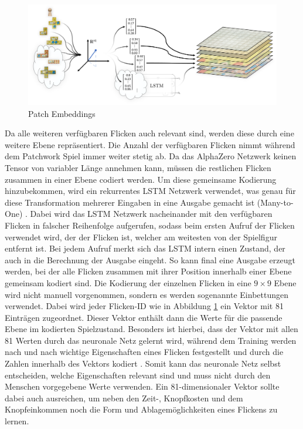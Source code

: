 \vspace*{-5cm}
\pagebreak

\begin{figure}[!ht]
    \centering
    \includegraphics[width=\textwidth]{res/pictures/patch-embeddings.png}
    \vspace*{-0.5cm}
    \caption{Patch Embeddings}
    \label{fig:patch-embeddings}
\end{figure}
\vspace*{-0.25cm}

Da alle weiteren verfügbaren Flicken auch relevant sind, werden diese durch eine weitere Ebene repräsentiert. Die Anzahl der verfügbaren Flicken nimmt während dem Patchwork Spiel immer weiter stetig ab. Da das AlphaZero Netzwerk keinen Tensor von variabler Länge annehmen kann, müssen die restlichen Flicken zusammen in einer Ebene codiert werden. Um diese gemeinsame Kodierung hinzubekommen, wird ein rekurrentes \ac{LSTM} Netzwerk verwendet, was genau für diese Transformation mehrerer Eingaben in eine Ausgabe gemacht ist (Many-to-One) \cite{2015.RNN}. Dabei wird das \ac{LSTM} Netzwerk nacheinander mit den verfügbaren Flicken in falscher Reihenfolge aufgerufen, sodass beim ersten Aufruf der Flicken verwendet wird, der der Flicken ist, welcher am weitesten von der Spielfigur entfernt ist. Bei jedem Aufruf merkt sich das \ac{LSTM} intern einen Zustand, der auch in die Berechnung der Ausgabe eingeht. So kann final eine Ausgabe erzeugt werden, bei der alle Flicken zusammen mit ihrer Position innerhalb einer Ebene gemeinsam kodiert sind. Die Kodierung der einzelnen Flicken in eine $9\times 9$ Ebene wird nicht manuell vorgenommen, sondern es werden sogenannte Einbettungen verwendet. Dabei wird jeder Flicken-\ac{ID} wie in Abbildung \ref{fig:patch-embeddings} ein Vektor mit 81 Einträgen zugeordnet. Dieser Vektor enthält dann die Werte für die passende Ebene im kodierten Spielzustand. Besonders ist hierbei, dass der Vektor mit allen 81 Werten durch das neuronale Netz gelernt wird, \dash während dem Training werden nach und nach wichtige Eigenschaften eines Flicken festgestellt und durch die Zahlen innerhalb des Vektors kodiert \cite{2023.PytorchEmbedding}. Somit kann das neuronale Netz selbst entscheiden, welche Eigenschaften relevant sind und muss nicht durch den Menschen vorgegebene Werte verwenden. Ein 81-dimensionaler Vektor sollte dabei auch ausreichen, um neben den Zeit-, Knopfkosten und dem Knopfeinkommen noch die Form und Ablagemöglichkeiten eines Flickens zu lernen.


